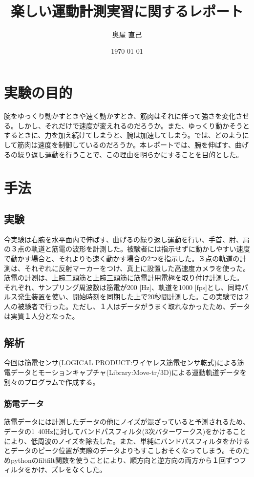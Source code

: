 \documentclass{jsarticle}
\title{楽しい運動計測実習に関するレポート}
\date{\today}
\author{奥屋 直己}
\begin{document}
\maketitle

\section{実験の目的}

腕をゆっくり動かすときや速く動かすとき、筋肉はそれに伴って強さを変化させる。しかし、それだけで速度が変えれるのだろうか。また、ゆっくり動かそうとするときに、力を加え続けてしまうと、腕は加速してしまう。では、どのようにして筋肉は速度を制御しているのだろうか。本レポートでは、腕を伸ばす、曲げるの繰り返し運動を行うことで、この理由を明らかにすることを目的とした。

\section{手法}

\subsection{実験}

今実験は右腕を水平面内で伸ばす、曲げるの繰り返し運動を行い、手首、肘、肩の３点の軌道と筋電の波形を計測した。被験者には指示せずに動かしやすい速度で動かす場合と、それよりも速く動かす場合の2つを指示した。３点の軌道の計測は、それぞれに反射マーカーをつけ、真上に設置した高速度カメラを使った。筋電の計測は、上腕二頭筋と上腕三頭筋に筋電計用電極を取り付け計測した。
それぞれ、サンプリング周波数は筋電が200 [Hz]、軌道を1000 [fps]とし、同時パルス発生装置を使い、開始時刻を同期した上で20秒間計測した。この実験では２人の被験者で行った。ただし、１人はデータがうまく取れなかったため、データは実質１人分となった。
\subsection{解析}

今回は筋電センサ(LOGICAL PRODUCT:ワイヤレス筋電センサ乾式)による筋電データとモーションキャプチャ(Library:Move-tr/3D)による運動軌道データを別々のプログラムで作成する。

\subsubsection{筋電データ}

筋電データには計測したデータの他にノイズが混ざっていると予測されるため、データの1~40Hzに対してバンドパスフィルタ(3次バターワークス)をかけることにより、低周波のノイズを除去した。また、単純にバンドパスフィルタをかけるとデータのピーク位置が実際のデータよりもすこしおそくなってしまう。そのためpythonのfiltfilt関数を使うことにより、順方向と逆方向の両方から１回ずつフィルタをかけ、ズレをなくした。
\end{document}
